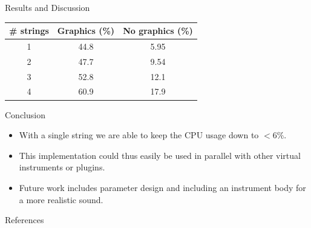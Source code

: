 \documentclass[a0paper,portrait]{baposter}
\begin{document}
\begin{poster}
\begin{posterbox}[name=discussion,column=2,row=0]{Results and Discussion}
\begin{center}
\begin{tabular}{|c|c|c|}
   \# strings & Graphics (\%) & No graphics (\%)\\
    \hline
    1 & 44.8 & 5.95\\
    2 & 47.7 & 9.54\\
    3 & 52.8 & 12.1 \\
    4 & 60.9 & 17.9\\
    \hline
 \end{tabular}
  \label{tab:results}
\end{center}
\end{posterbox}

\begin{posterbox}[name=conclusion,column=2,below=discussion]{Conclusion}
  \begin{itemize}
    \item With a single string we are able to keep the CPU usage down to $<6\%$.
    \item This implementation could thus easily be used in parallel with other virtual instruments or plugins.
    \item Future work includes parameter design and including an instrument body for a more realistic sound. 
  \end{itemize}
\end{posterbox}


\begin{posterbox}[name=refs,column=2, below=conclusion,above=bottom]{References}


\end{posterbox}
\end{poster}
\end{document}
